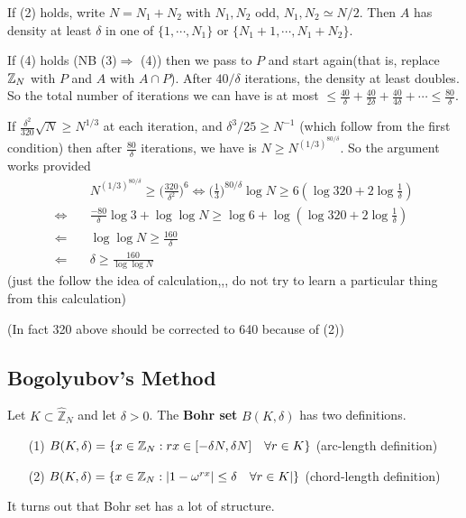 \documentclass[12pt,a4paper]{report}
\renewcommand{\hat}{\widehat}
\begin{document}
\quad If (2) holds, write $N=N_1+N_2$ with $N_1, N_2$ odd, $N_1, N_2 \simeq N/2$. Then $A$ has density at least $\delta$ in one of $\{1,\cdots, N_1\}$ or $\{N_1 +1, \cdots, N_1 + N_2\}$.

\quad If (4) holds (NB (3)$\Rightarrow$ (4)) then we pass to $P$ and start again(that is, replace $\mathbb{Z}_N$ with $P$ and $A$ with $A\cap P$). After $40/\delta$ iterations, the density at least doubles. So the total number of iterations we can have is at most $\leq \frac{40}{\delta} + \frac{40}{2\delta} + \frac{40}{4\delta} + \cdots \leq \frac{80}{\delta}$.

\quad If $\frac{\delta^2}{320} \sqrt{N} \geq N^{1/3}$ at each iteration, and $\delta^3/25 \geq N^{-1}$ (which follow from the first condition) then after $\frac{80}{\delta}$ iterations, we have is $N\geq N^{(1/3)^{80/\delta}}$. So the argument works provided
\begin{align*}
&N^{(1/3)^{80/\delta}} \geq \Big( \frac{320}{\delta^2} \Big)^6 \Leftrightarrow \Big( \frac{1}{3} \Big)^{80/\delta} \log N \geq 6(\log 320 + 2\log \frac{1}{\delta}) \\
\Leftrightarrow \quad & \frac{-80}{\delta} \log 3 + \log \log N \geq \log 6 + \log (\log 320 + 2\log \frac{1}{\delta}) \\
\Leftarrow \quad &\log \log N \geq \frac{160}{\delta} \\
\Leftarrow \quad &\delta\geq \frac{160}{\log \log N}
\end{align*}
(just the follow the idea of calculation,,, do not try to learn a particular thing from this calculation)

(In fact 320 above should be corrected to 640 because of (2))
\s

\subsection*{Bogolyubov's Method}

 Let $K \subset \hat{\mathbb{Z}}_N$ and let $\delta >0$. The \textbf{Bohr set} $B(K,\delta)$ has two definitions.
\begin{itemize}
\item[(1)] $B(K,\delta) = \{x\in \mathbb{Z}_N : rx \in [-\delta N, \delta N] \quad \forall r\in K \}$ (arc-length definition)
\item[(2)] $B(K,\delta) = \{x\in \mathbb{Z}_N : |1- \omega^{rx}| \leq \delta \quad \forall r\in K|\}$ (chord-length definition)
\end{itemize}
\s

It turns out that Bohr set has a lot of structure.
\s
\end{document}
